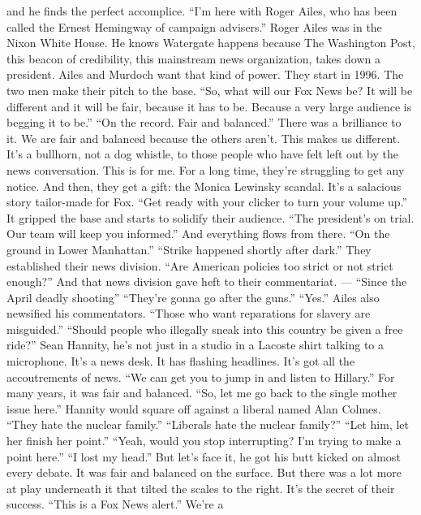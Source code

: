 \begin{itemize}
  and he finds the perfect accomplice. ``I'm here with Roger Ailes, who
  has been called the Ernest Hemingway of campaign advisers.'' Roger
  Ailes was in the Nixon White House. He knows Watergate happens because
  The Washington Post, this beacon of credibility, this mainstream news
  organization, takes down a president. Ailes and Murdoch want that kind
  of power. They start in 1996. The two men make their pitch to the
  base. ``So, what will our Fox News be? It will be different and it
  will be fair, because it has to be. Because a very large audience is
  begging it to be.'' ``On the record. Fair and balanced.'' There was a
  brilliance to it. We are fair and balanced because the others aren't.
  This makes us different. It's a bullhorn, not a dog whistle, to those
  people who have felt left out by the news conversation. This is for
  me. For a long time, they're struggling to get any notice. And then,
  they get a gift: the Monica Lewinsky scandal. It's a salacious story
  tailor-made for Fox. ``Get ready with your clicker to turn your volume
  up.'' It gripped the base and starts to solidify their audience. ``The
  president's on trial. Our team will keep you informed.'' And
  everything flows from there. ``On the ground in Lower Manhattan.''
  ``Strike happened shortly after dark.'' They established their news
  division. ``Are American policies too strict or not strict enough?''
  And that news division gave heft to their commentariat. --- ``Since
  the April deadly shooting'' ``They're gonna go after the guns.''
  ``Yes.'' Ailes also newsified his commentators. ``Those who want
  reparations for slavery are misguided.'' ``Should people who illegally
  sneak into this country be given a free ride?'' Sean Hannity, he's not
  just in a studio in a Lacoste shirt talking to a microphone. It's a
  news desk. It has flashing headlines. It's got all the accoutrements
  of news. ``We can get you to jump in and listen to Hillary.'' For many
  years, it was fair and balanced. ``So, let me go back to the single
  mother issue here.'' Hannity would square off against a liberal named
  Alan Colmes. ``They hate the nuclear family.'' ``Liberals hate the
  nuclear family?'' ``Let him, let her finish her point.'' ``Yeah, would
  you stop interrupting? I'm trying to make a point here.'' ``I lost my
  head.'' But let's face it, he got his butt kicked on almost every
  debate. It was fair and balanced on the surface. But there was a lot
  more at play underneath it that tilted the scales to the right. It's
  the secret of their success. ``This is a Fox News alert.'' We're a

\end{itemize}
